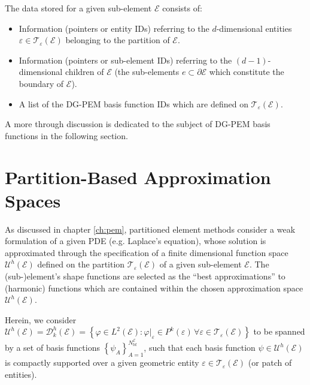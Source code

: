 	The data stored for a given sub-element $\mathcal{E}$ consists of:
	\begin{itemize}
		\item Information (pointers or entity IDs) referring to the $d$-dimensional entities $\varepsilon \in \mathcal{T}_\varepsilon (\mathcal{E})$ belonging to the partition of $\mathcal{E}$.
		\item Information (pointers or sub-element IDs) referring to the $(d-1)$-dimensional children of $\mathcal{E}$ (the sub-elements $e \subset \partial \mathcal{E}$ which constitute the boundary of $\mathcal{E}$).
		\item A list of the DG-PEM basis function IDs which are defined on $\mathcal{T}_\varepsilon (\mathcal{E})$.
	\end{itemize}
	
	A more through discussion is dedicated to the subject of DG-PEM basis functions in the following section.
	
\section{Partition-Based Approximation Spaces}

		As discussed in chapter \ref{ch:pem}, partitioned element methods consider a weak formulation of a given PDE (e.g. Laplace's equation), whose solution is approximated through the specification of a finite dimensional function space $\mathcal{U}^h (\mathcal{E})$ defined on the partition $\mathcal{T}_{\varepsilon} (\mathcal{E})$ of a given sub-element $\mathcal{E}$. The (sub-)element's shape functions are selected as the ``best approximations'' to (harmonic) functions which are contained within the chosen approximation space $\mathcal{U}^h (\mathcal{E})$.
		
		Herein, we consider $\mathcal{U}^h (\mathcal{E}) = \mathcal{D}^h_k (\mathcal{E}) = \left\{ \varphi \in L^2 (\mathcal{E}) : \varphi|_{\varepsilon} \in P^k (\varepsilon) \, \forall \varepsilon \in \mathcal{T}_\varepsilon (\mathcal{E}) \right\}$ to be spanned by a set of basis functions $\left\{ \psi_A \right\}_{A=1}^{N^{\mathcal{E}}_{\mathrm b\mathrm f}}$, such that each basis function $\psi \in \mathcal{U}^h (\mathcal{E})$ is compactly supported over a given geometric entity $\varepsilon \in \mathcal{T}_\varepsilon (\mathcal{E})$ (or patch of entities).
		
